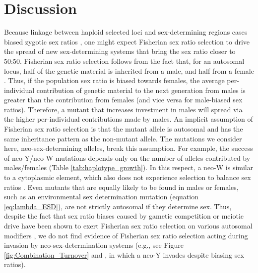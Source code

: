 \documentclass[12pt]{article}
\begin{document}
\section*{Discussion}

Because linkage between haploid selected loci and sex-determining regions cases biased zygotic sex ratios \citep{Hamilton:1967ts,Burt:2006,Field:2012fd,Field:2013cc}, one might expect Fisherian sex ratio selection to drive the spread of new sex-determining systems that bring the sex ratio closer to 50:50. 
Fisherian sex ratio selection follows from the fact that, for an autosomal locus, half of the genetic material is inherited from a male, and half from a female \citep{Fisher:1930wy,West:2009we}. 
Thus, if the population sex ratio is biased towards females, the average per-individual contribution of genetic material to the next generation from males is greater than the contribution from females (and vice versa for male-biased sex ratios). 
Therefore, a mutant that increases investment in males will spread via the higher per-individual contributions made by males. 
An implicit assumption of Fisherian sex ratio selection is that the mutant allele is autosomal and has the same inheritance pattern as the non-mutant allele. 
The mutations we consider here, neo-sex-determining alleles, break this assumption. 
For example, the success of neo-Y/neo-W mutations depends only on the number of alleles contributed by males/females (Table \ref{tab:haplotype_growth}). 
In this respect, a neo-W is similar to a cytoplasmic element, which also does not experience selection to balance sex ratios \citep{Frank:1989vl,Werren:1998co,Chase:2007bf}.
Even mutants that are equally likely to be found in males or females, such as an environmental sex determination mutation (equation \ref{eq:lambda_ESD}), are not strictly autosomal if they determine sex. 
Thus, despite the fact that sex ratio biases caused by gametic competition or meiotic drive have been shown to exert Fisherian sex ratio selection on various autosomal modifiers \citep{Stalker:1961th,Smith:1975ft,Frank:1989vl,Hough:2013uo,Ubeda:2015fx, Otto:2015va}, we do not find evidence of Fisherian sex ratio selection acting during invasion by neo-sex-determination systems (e.g., see Figure \ref{fig:Combination_Turnover} and \citealt{Ubeda:2015fx}, in which a neo-Y invades despite biasing sex ratios). 
\end{document}
